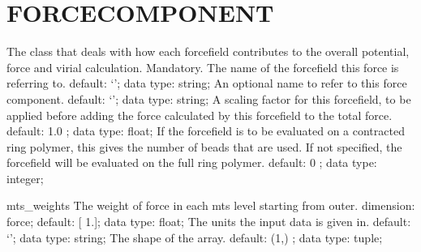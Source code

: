 \section{FORCECOMPONENT}
\label{FORCECOMPONENT}
\begin{ipifield}{}%
{The class that deals with how each forcefield contributes to the overall potential, force and virial calculation.}%
{}%
{%
{Mandatory. The name of the forcefield this force is referring to.}%
{default: `'; data type: string; }%
%
{An optional name to refer to this force component.}%
{default: `'; data type: string; }%
%
{A scaling factor for this forcefield, to be applied before adding the force calculated by this forcefield to the total force.}%
{default:  1.0 ; data type: float; }%
%
{If the forcefield is to be evaluated on a contracted ring polymer, this gives the number of beads that are used. If not specified, the forcefield will be evaluated on the full ring polymer.}%
{default:  0 ; data type: integer; }%
}
\begin{ipifield}{mts\_weights}%
{The weight of force in each mts level starting from outer.}%
{dimension: force; default: 
      [ 1.]; data type: float; }%
{%
{The units the input data is given in.}%
{default: `'; data type: string; }%
%
{The shape of the array.}%
{default:  (1,) ; data type: tuple; }%
}
\end{ipifield}
\end{ipifield}
